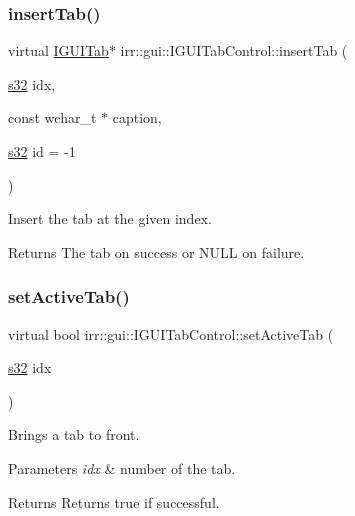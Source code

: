 \subsubsection{\texorpdfstring{insert\+Tab()}{insertTab()}}
{\footnotesize\ttfamily virtual \hyperlink{classirr_1_1gui_1_1IGUITab}{I\+G\+U\+I\+Tab}$\ast$ irr\+::gui\+::\+I\+G\+U\+I\+Tab\+Control\+::insert\+Tab (\begin{DoxyParamCaption}\item[{\hyperlink{namespaceirr_ac66849b7a6ed16e30ebede579f9b47c6}{s32}}]{idx,  }\item[{const wchar\+\_\+t $\ast$}]{caption,  }\item[{\hyperlink{namespaceirr_ac66849b7a6ed16e30ebede579f9b47c6}{s32}}]{id = {\ttfamily -\/1} }\end{DoxyParamCaption})\hspace{0.3cm}{\ttfamily [pure virtual]}}



Insert the tab at the given index. 

\begin{DoxyReturn}{Returns}
The tab on success or N\+U\+LL on failure. 
\end{DoxyReturn}
\mbox{\label{classirr_1_1gui_1_1IGUITabControl_a2a2d810ff8a79c4226831b689a4d8b3a}} 
\subsubsection{\texorpdfstring{set\+Active\+Tab()}{setActiveTab()}\hspace{0.1cm}{\footnotesize\ttfamily [1/2]}}
{\footnotesize\ttfamily virtual bool irr\+::gui\+::\+I\+G\+U\+I\+Tab\+Control\+::set\+Active\+Tab (\begin{DoxyParamCaption}\item[{\hyperlink{namespaceirr_ac66849b7a6ed16e30ebede579f9b47c6}{s32}}]{idx }\end{DoxyParamCaption})\hspace{0.3cm}{\ttfamily [pure virtual]}}



Brings a tab to front. 


\begin{DoxyParams}{Parameters}
{\em idx} & number of the tab. \\
\hline
\end{DoxyParams}
\begin{DoxyReturn}{Returns}
Returns true if successful. 
\end{DoxyReturn}
\mbox{\label{classirr_1_1gui_1_1IGUITabControl_acea5fca2d2a883a450d4df823eea27d5}} 
